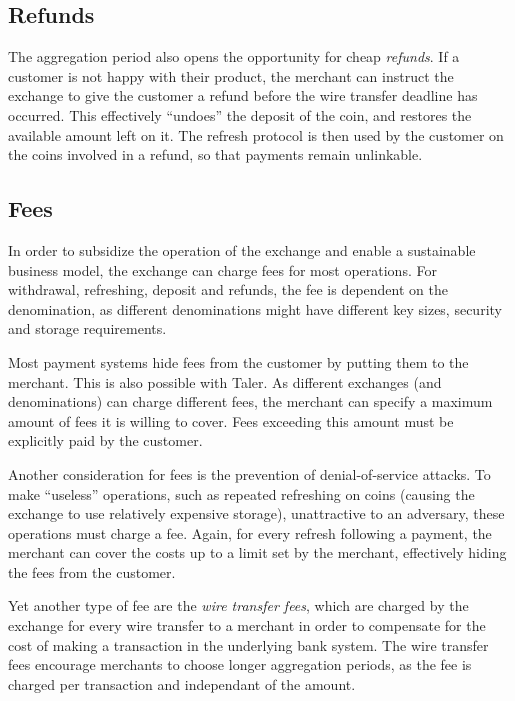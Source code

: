\subsection{Refunds}

The aggregation period also opens the opportunity for cheap \emph{refunds}.  If
a customer is not happy with their product, the merchant can instruct the
exchange to give the customer a refund before the wire transfer deadline has
occurred.  This effectively ``undoes'' the deposit of the coin, and restores the
available amount left on it.  The refresh protocol is then used by the customer
on the coins involved in a refund, so that payments remain unlinkable.


\subsection{Fees}

In order to subsidize the operation of the exchange and enable a sustainable
business model, the exchange can charge fees for most operations.  For
withdrawal, refreshing, deposit and refunds, the fee is dependent on the denomination,
as different denominations might have different key sizes, security and storage
requirements.

Most payment systems hide fees from the customer by putting them to the merchant.
This is also possible with Taler.  As different exchanges (and denominations)
can charge different fees, the merchant can specify a maximum amount of fees it
is willing to cover.  Fees exceeding this amount must be explicitly paid by the
customer.

Another consideration for fees is the prevention of denial-of-service attacks.
To make ``useless'' operations, such as repeated refreshing on coins
(causing the exchange to use relatively expensive storage), unattractive to an
adversary, these operations must charge a fee.  Again, for every refresh
following a payment, the merchant can cover the costs up to a limit set by the
merchant, effectively hiding the fees from the customer.

Yet another type of fee are the \emph{wire transfer fees}, which are charged
by the exchange for every wire transfer to a merchant in order to compensate for
the cost of making a transaction in the underlying bank system.  The wire
transfer fees encourage merchants to choose longer aggregation periods, as the
fee is charged per transaction and independant of the amount.

